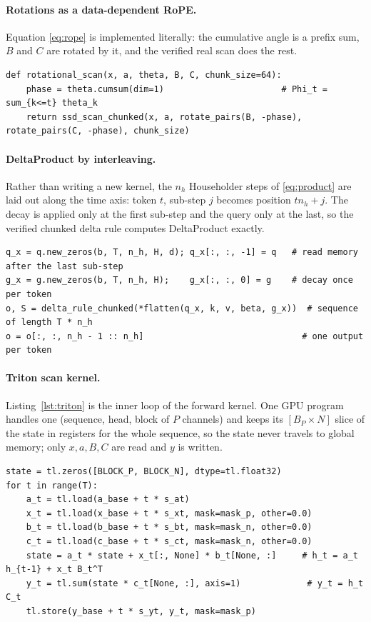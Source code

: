 \paragraph{Rotations as a data-dependent RoPE.} Equation \eqref{eq:rope} is implemented literally: the
cumulative angle is a prefix sum, $B$ and $C$ are rotated by it, and the verified real scan does the rest.
\begin{lstlisting}[caption={Rotational SSM (\texttt{layers/ssm.py}).},label={lst:rot}]
def rotational_scan(x, a, theta, B, C, chunk_size=64):
    phase = theta.cumsum(dim=1)                       # Phi_t = sum_{k<=t} theta_k
    return ssd_scan_chunked(x, a, rotate_pairs(B, -phase), rotate_pairs(C, -phase), chunk_size)
\end{lstlisting}

\paragraph{DeltaProduct by interleaving.} Rather than writing a new kernel, the $n_h$ Householder steps of
\eqref{eq:product} are laid out along the time axis: token $t$, sub-step $j$ becomes position $tn_h+j$.
The decay is applied only at the first sub-step and the query only at the last, so the verified chunked
delta rule computes DeltaProduct exactly.
\begin{lstlisting}[caption={DeltaProduct via interleaving (\texttt{layers/deltanet.py}).},label={lst:prod}]
q_x = q.new_zeros(b, T, n_h, H, d); q_x[:, :, -1] = q   # read memory after the last sub-step
g_x = g.new_zeros(b, T, n_h, H);    g_x[:, :, 0] = g    # decay once per token
o, S = delta_rule_chunked(*flatten(q_x, k, v, beta, g_x))  # sequence of length T * n_h
o = o[:, :, n_h - 1 :: n_h]                               # one output per token
\end{lstlisting}

\paragraph{Triton scan kernel.} Listing~\ref{lst:triton} is the inner loop of the forward kernel. One GPU
program handles one (sequence, head, block of $P$ channels) and keeps its $[B_P\times N]$ slice of the state
in registers for the whole sequence, so the state never travels to global memory; only $x,a,B,C$ are read
and $y$ is written.
\begin{lstlisting}[caption={Inner loop of the Triton scan kernel (\texttt{layers/triton\_scan.py}).},label={lst:triton}]
state = tl.zeros([BLOCK_P, BLOCK_N], dtype=tl.float32)
for t in range(T):
    a_t = tl.load(a_base + t * s_at)
    x_t = tl.load(x_base + t * s_xt, mask=mask_p, other=0.0)
    b_t = tl.load(b_base + t * s_bt, mask=mask_n, other=0.0)
    c_t = tl.load(c_base + t * s_ct, mask=mask_n, other=0.0)
    state = a_t * state + x_t[:, None] * b_t[None, :]     # h_t = a_t h_{t-1} + x_t B_t^T
    y_t = tl.sum(state * c_t[None, :], axis=1)             # y_t = h_t C_t
    tl.store(y_base + t * s_yt, y_t, mask=mask_p)
\end{lstlisting}

